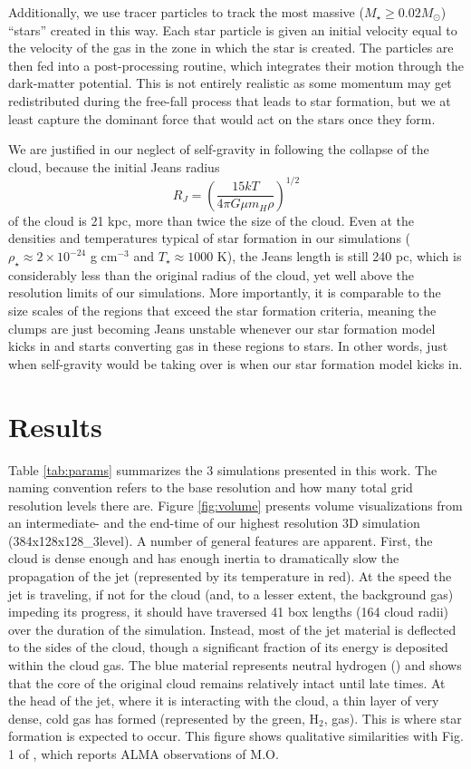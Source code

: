\documentclass{aastex6}
\begin{document}
Additionally, we use tracer particles to track the most massive ($M_\star \ge 0.02 M_\odot$) ``stars'' created in this way.  Each star particle is given an initial velocity equal to the velocity of the gas in the zone in which the star is created. The particles are then fed into a post-processing routine, which integrates their motion through the dark-matter potential. This is not entirely realistic as some momentum may get redistributed during the free-fall process that leads to star formation, but we at least capture the dominant force that would act on the stars once they form.

We are justified in our neglect of self-gravity in following the collapse of the cloud, because the initial Jeans radius
\begin{equation}
R_J = \left(\frac{15 kT}{4\pi G\mu m_H \rho}\right)^{1/2}
\end{equation}
of the cloud is 21 kpc, more than twice the size of the cloud. Even at the densities and temperatures typical of star formation in our simulations ($\rho_\star \approx 2 \times 10^{-24}$ g cm$^{-3}$ and  $T_\star \approx 1000$ K), the Jeans length is still 240 pc, which is considerably less than the original radius of the cloud, yet well above the resolution limits of our simulations. More importantly, it is comparable to the size scales of the regions that exceed the star formation criteria, meaning the clumps are just becoming Jeans unstable whenever our star formation model kicks in and starts converting gas in these regions to stars. In other words, just when self-gravity would be taking over is when our star formation model kicks in.


\section{Results}

Table \ref{tab:params} summarizes the 3 simulations presented in this work.  The naming convention refers to the base resolution and how many total grid resolution levels there are.  Figure \ref{fig:volume} presents volume visualizations from an intermediate- and the end-time of our highest resolution 3D simulation (384x128x128\_3level).  A number of general features are apparent.  First, the cloud is dense enough and has enough inertia to dramatically slow the propagation of the jet (represented by its temperature in red).  At the speed the jet is traveling, if not for the cloud (and, to a lesser extent, the background gas) impeding its progress, it should have traversed 41 box lengths (164 cloud radii) over the duration of the simulation.  Instead, most of the jet material is deflected to the sides of the cloud, though a significant fraction of its energy is deposited within the cloud gas.  The blue material represents neutral hydrogen () and shows that the core of the original cloud remains relatively intact until late times. At the head of the jet, where it is interacting with the cloud, a thin layer of very dense, cold gas has formed (represented by the green, H$_2$, gas). This is where star formation is expected to occur. This figure shows qualitative similarities with Fig. 1 of \citet[][hereafter L17]{Lacy17}, which reports ALMA observations of M.O. 
\end{document}
